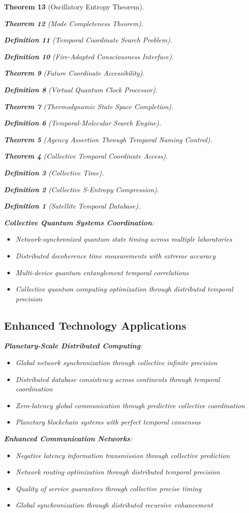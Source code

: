 \documentclass[12pt,a4paper]{article}
\newtheorem{theorem}{Theorem}[section]
\newtheorem{definition}[theorem]{Definition}
\begin{document}
\begin{theorem}[Oscillatory Entropy Theorem]
\begin{theorem}[Mode Completeness Theorem]
\begin{enumerate}
\begin{definition}[Temporal Coordinate Search Problem]
\begin{algorithm}
\begin{definition}[Fire-Adapted Consciousness Interface]
\begin{theorem}[Future Coordinate Accessibility]
\begin{definition}[Virtual Quantum Clock Processor]
\begin{itemize}
\begin{itemize}
\begin{theorem}[Thermodynamic State Space Completion]
\begin{definition}[Temporal-Molecular Search Engine]
\begin{theorem}[Agency Assertion Through Temporal Naming Control]
\begin{remark}
\begin{theorem}[Collective Temporal Coordinate Access]
\begin{definition}[Collective Time]
\begin{definition}[Collective S-Entropy Compression]
\begin{definition}[Satellite Temporal Database]
\begin{algorithm}
\begin{table}[h]
\textbf{Collective Quantum Systems Coordination}:
\begin{itemize}
\item Network-synchronized quantum state timing across multiple laboratories
\item Distributed decoherence time measurements with extreme accuracy
\item Multi-device quantum entanglement temporal correlations
\item Collective quantum computing optimization through distributed temporal precision
\end{itemize}

\subsection{Enhanced Technology Applications}

\textbf{Planetary-Scale Distributed Computing}:
\begin{itemize}
\item Global network synchronization through collective infinite precision
\item Distributed database consistency across continents through temporal coordination
\item Zero-latency global communication through predictive collective coordination
\item Planetary blockchain systems with perfect temporal consensus
\end{itemize}

\textbf{Enhanced Communication Networks}:
\begin{itemize}
\item Negative latency information transmission through collective prediction
\item Network routing optimization through distributed temporal precision
\item Quality of service guarantees through collective precise timing
\item Global synchronization through distributed recursive enhancement
\end{itemize}


\end{table}
\end{algorithm}
\end{definition}
\end{definition}
\end{definition}
\end{theorem}
\end{remark}
\end{theorem}
\end{definition}
\end{theorem}
\end{itemize}
\end{itemize}
\end{definition}
\end{theorem}
\end{definition}
\end{algorithm}
\end{definition}
\end{enumerate}
\end{theorem}
\end{theorem}
\end{document}
